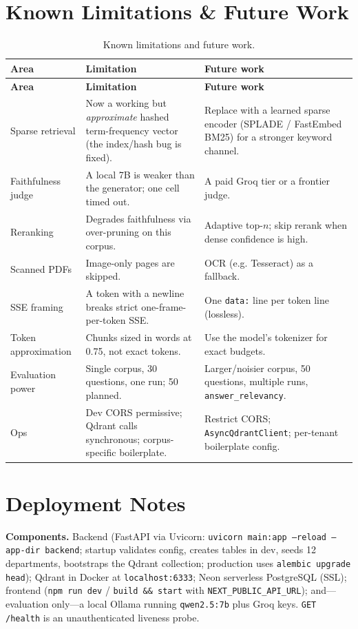 \documentclass[11pt,a4paper,oneside]{report}
\newcommand{\code}[1]{\texttt{#1}}
\begin{document}
\section{Known Limitations \& Future Work}
\begin{small}
\begin{longtable}{|L{2.6cm}|L{5.0cm}|L{6.4cm}|}
\caption{Known limitations and future work.}\label{tab:future}\\
\hline
{}
{\color{white}\textbf{Area}} & {\color{white}\textbf{Limitation}} & {\color{white}\textbf{Future work}}\\ \hline
\endfirsthead
\hline
{}
{\color{white}\textbf{Area}} & {\color{white}\textbf{Limitation}} & {\color{white}\textbf{Future work}}\\ \hline
\endhead
\hline
\endfoot
Sparse retrieval & Now a working but \emph{approximate} hashed term-frequency vector (the index/hash bug is fixed). & Replace with a learned sparse encoder (SPLADE / FastEmbed BM25) for a stronger keyword channel.\\ \hline
Faithfulness judge & A local 7B is weaker than the generator; one cell timed out. & A paid Groq tier or a frontier judge.\\ \hline
Reranking & Degrades faithfulness via over-pruning on this corpus. & Adaptive top-$n$; skip rerank when dense confidence is high.\\ \hline
Scanned PDFs & Image-only pages are skipped. & OCR (e.g. Tesseract) as a fallback.\\ \hline
SSE framing & A token with a newline breaks strict one-frame-per-token SSE. & One \code{data:} line per token line (lossless).\\ \hline
Token approximation & Chunks sized in words at 0.75, not exact tokens. & Use the model's tokenizer for exact budgets.\\ \hline
Evaluation power & Single corpus, 30 questions, one run; 50 planned. & Larger/noisier corpus, 50 questions, multiple runs, \code{answer\_relevancy}.\\ \hline
Ops & Dev CORS permissive; Qdrant calls synchronous; corpus-specific boilerplate. & Restrict CORS; \code{AsyncQdrantClient}; per-tenant boilerplate config.\\ \hline
\end{longtable}
\end{small}

\section{Deployment Notes}
\textbf{Components.} Backend (FastAPI via Uvicorn: \code{uvicorn main:app --reload --app-dir backend};
startup validates config, creates tables in dev, seeds 12 departments, bootstraps the Qdrant
collection; production uses \code{alembic upgrade head}); Qdrant in Docker at \code{localhost:6333};
Neon serverless PostgreSQL (SSL); frontend (\code{npm run dev} / \code{build \&\& start} with
\code{NEXT\_PUBLIC\_API\_URL}); and---evaluation only---a local Ollama running \code{qwen2.5:7b} plus
Groq keys. \code{GET /health} is an unauthenticated liveness probe.
\end{document}
